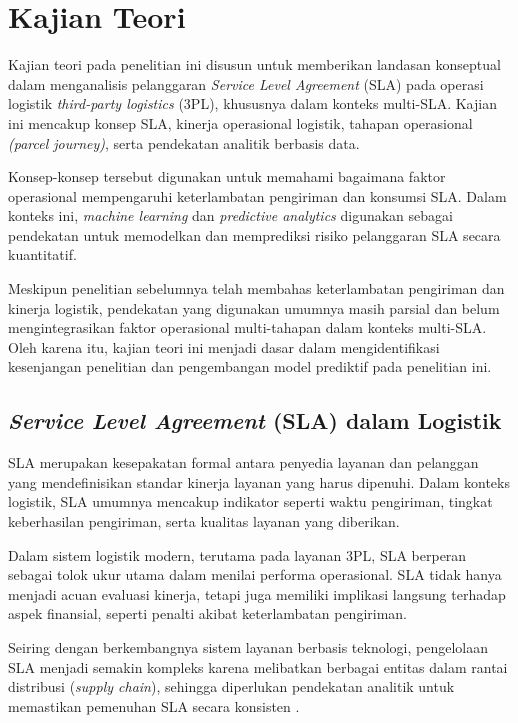 \section{Kajian Teori}
\label{sec:2_2}
Kajian teori pada penelitian ini disusun untuk memberikan landasan konseptual dalam menganalisis pelanggaran \textit{Service Level Agreement} (SLA) pada operasi logistik \textit{third-party logistics} (3PL), khususnya dalam konteks multi-SLA. Kajian ini mencakup konsep SLA, kinerja operasional logistik, tahapan operasional \textit{(parcel journey)}, serta pendekatan analitik berbasis data. 

Konsep-konsep tersebut digunakan untuk memahami bagaimana faktor operasional mempengaruhi keterlambatan pengiriman dan konsumsi SLA. Dalam konteks ini, \textit{machine learning} dan \textit{predictive analytics} digunakan sebagai pendekatan untuk memodelkan dan memprediksi risiko pelanggaran SLA secara kuantitatif. 

Meskipun penelitian sebelumnya telah membahas keterlambatan pengiriman dan kinerja logistik, pendekatan yang digunakan umumnya masih parsial dan belum mengintegrasikan faktor operasional multi-tahapan dalam konteks multi-SLA. Oleh karena itu, kajian teori ini menjadi dasar dalam mengidentifikasi kesenjangan penelitian dan pengembangan model prediktif pada penelitian ini.

\subsection{\textit{Service Level Agreement} (SLA) dalam Logistik}

SLA merupakan kesepakatan formal antara penyedia layanan dan pelanggan yang mendefinisikan standar kinerja layanan yang harus dipenuhi. Dalam konteks logistik, SLA umumnya mencakup indikator seperti waktu pengiriman, tingkat keberhasilan pengiriman, serta kualitas layanan yang diberikan. 

Dalam sistem logistik modern, terutama pada layanan 3PL, SLA berperan sebagai tolok ukur utama dalam menilai performa operasional. SLA tidak hanya menjadi acuan evaluasi kinerja, tetapi juga memiliki implikasi langsung terhadap aspek finansial, seperti penalti akibat keterlambatan pengiriman. 

Seiring dengan berkembangnya sistem layanan berbasis teknologi, pengelolaan SLA menjadi semakin kompleks karena melibatkan berbagai entitas dalam rantai distribusi (\textit{supply chain}), sehingga diperlukan pendekatan analitik untuk memastikan pemenuhan SLA secara konsisten \citep{engel2022}.


